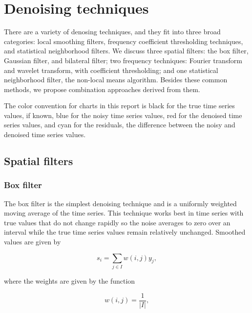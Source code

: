 \documentclass[11pt]{article}
\theoremstyle{definition}
\begin{document}
\section{Denoising techniques}\label{denoise}

There are a variety of denosing techniques, and they fit into three
broad categories: local smoothing filters, frequency coefficient
thresholding techniques, and statistical neighborhood filters. We
discuss three spatial filters: the box filter, Gaussian filter, and
bilateral filter; two frequency techniques: Fourier transform and
wavelet transform, with coefficient thresholding; and one statistical
neighborhood filter, the non-local means algorithm. Besides these common methods, we
propose combination approaches derived from them.

The color convention for charts in this report is black for the true
time series values, if known, blue for the noisy time series values,
red for the denoised time series values, and cyan for the residuals,
the difference between the noisy and denoised time series values.  

\subsection{Spatial filters}
\subsubsection{Box filter} 
The box filter is the simplest denoising technique and is a uniformly
weighted moving average of the time series. This technique works best
in time series with true values that do not change rapidly so the
noise averages to zero over an interval while the true time series
values remain relatively unchanged. Smoothed values are given by

\begin{displaymath}
s_i = \sum _{j \in I} w \left(i, j \right) y_j,
\end{displaymath}

\noindent
where the weights are given by the function

\begin{displaymath}
w\left(i, j\right) = \frac{1}{\lvert I \rvert},
\end{displaymath}
\end{document}
